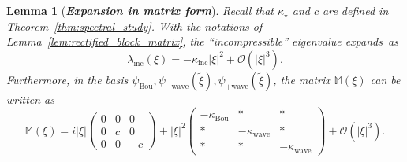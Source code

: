 \documentclass[10pt]{amsart}
\newtheorem{lemm}[theo]{Lemma}\newtheorem{prop}[theo]{Proposition}\newtheorem{coro}[theo]{Corollary}\newtheorem{conj}[theo]{Conjecture}
\theoremstyle{definition}\newtheorem{defi}[theo]{Definition}\newtheorem{rema}[theo]{Remark}\newtheorem{exam}[theo]{Example}\newtheorem{exem}[theo]{Example}\newtheorem{nota}[theo]{Notation}
\newcommand{\Wave}{\mathrm{wave}}
\newcommand{\Inc}{\mathrm{inc}}
\newcommand{\Bou}{\mathrm{Bou}}
\newcommand{\rectsL}{\mathbb{M}}
\newcommand{\OO}{\mathcal{O}}
\begin{document}
\begin{lemm}[\emph{\textbf{Expansion in matrix form}}]\label{lem:expansion_rectified_matrix}
Recall that $\kappa_\star$ and $c$ are defined in Theorem~\ref{thm:spectral_study}. With the notations of Lemma~\ref{lem:rectified_block_matrix}, the ``incompressible'' eigenvalue expands~as
\begin{equation*}
\lambda_\Inc(\xi) = - \kappa_\Inc | \xi |^2 + \OO\left(| \xi |^3 \right).
\end{equation*}
Furthermore, in the basis $\psi_{\Bou}, \psi_{- \Wave}(\widetilde{\xi}), \psi_{ + \Wave}(\widetilde{\xi})$, the matrix $\rectsL(\xi)$ can be written as
\begin{equation}\label{eq:expansion_rectified_matrix}
\rectsL(\xi) = i | \xi |
\left(
\begin{matrix}
0 & 0 & 0 \\
0 & c & 0 \\
0 & 0 & - c
\end{matrix}
\right) + | \xi |^2 \left(
\begin{matrix}
- \kappa_\Bou & * & * \\
* & - \kappa_{\Wave} & * \\
* & * & - \kappa_{\Wave}
\end{matrix}
\right) + \OO\left(| \xi |^3 \right).
\end{equation}
\end{lemm}
\end{document}
